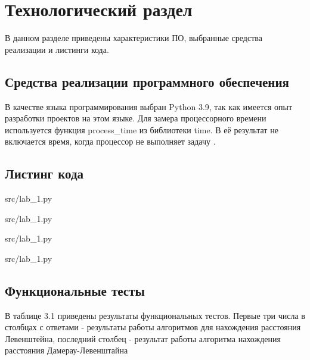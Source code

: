 \chapter{Технологический раздел}
В данном разделе приведены характеристики ПО, выбранные средства реализации и листинги кода.
\section{Средства реализации программного обеспечения}
В качестве языка программирования выбран Python 3.9, так как имеется опыт разработки проектов на этом языке.
Для замера процессорного времени используется функция process\_time из библиотеки time. В её результат не включается время, когда процессор не выполняет задачу \cite{python}. 
\section{Листинг кода}
\begin{lstinputlisting}[language=Python, caption=Рекурсивная реализация алгоритма поиска расстояния Левенштейна, linerange={3-16}, basicstyle=\small\sffamily, frame=single]{src/lab_1.py}
\end{lstinputlisting}

\begin{lstinputlisting}[language=Python, caption=Рекурсивная реализация (с матрицей) алгоритма поиска расстояния Левенштейна, linerange={17-38}, basicstyle=\small\sffamily, frame=single]{src/lab_1.py}
\end{lstinputlisting}

\begin{lstinputlisting}[language=Python, caption=Матричная реализация (с хранением двух строк) алгоритма поиска расстояния Левенштейна, linerange={49-66}, basicstyle=\small\sffamily, frame=single]{src/lab_1.py}
\end{lstinputlisting}

\begin{lstinputlisting}[language=Python, caption=Рекурсивная реализация (с матрицей) алгоритма поиска расстояния Дамерау-Левенштейна, linerange={67-98}, basicstyle=\small\sffamily, frame=single]{src/lab_1.py}
\end{lstinputlisting}


\clearpage
\section{Функциональные тесты}
В таблице 3.1 приведены результаты функциональных тестов. Первые три числа в столбцах с ответами - результаты работы алгоритмов для нахождения расстояния Левенштейна, последний столбец - результат работы алгоритма нахождения расстояния Дамерау-Левенштайна

